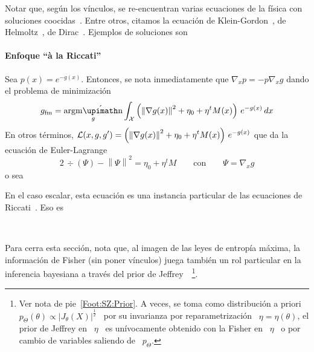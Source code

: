 Notar  que, seg\'un  los v\'inculos,  se re-encuentran  varias ecuaciones  de la
f\'isica con  soluciones coocidas~\cite{Fri98, Fri04}.  Entre  otros, citamos la
ecuaci\'on   de   Klein-Gordon~\cite{Fri90,    FriSof95,   Fri98,   Fri04},   de
Helmoltz~\cite{Fri90, FriSof95,  Fri98, Fri04}, de  Dirac~\cite{FriSof95, Fri98,
Fri04}. Ejemplos de soluciones son
%
\begin{itemize}
\end{itemize}




\paragraph{Enfoque ``\`a la Riccati''}

\cite{BorLew96, BorLew95, Ziv98, FriPla99}

Sea $p(x)  = e^{  - g(x)}$. Entonces,  se nota  inmediatamente que
$\nabla_x p = - p \nabla_x g$ dando el problema de minimizaci\'on
%
\[
g_{\mathrm{fm}} = \argmin_g \int_\X  \left( \left\| \nabla g(x) \right\|^2 + \eta_0  
  + \eta^t M(x) \right) \, e^{- g(x) } \, dx
\]
%
En otros t\'erminos, $\displaystyle \mathcal{L}(x , g , g') = \left( \left\| \nabla g(x) \right\|^2 + \eta_0  
  + \eta^t M(x) \right) \, e^{- g(x) }$ que da la ecuaci\'on de Euler-Lagrange
%
\[
2 \, \div\left( \Psi \right) - \left\| \Psi \right\|^2 = \eta_0 + \eta^t M \qquad \mbox{con} \qquad \Psi = \nabla_x g
\]
%
o sea

En el caso escalar, esta ecuaci\'on es una instancia particular de las ecuaciones de Riccati~\cite{Ric1724, Ric59}. Eso es 





\

Para  cerra esta  secci\'on, nota  que,  al imagen  de las  leyes de  entrop\'ia
m\'axima, la informaci\'on  de Fisher (sin poner v\'inculos)  juega tambi\'en un
rol   particular  en   la  inferencia   bayesiana  a   trav\'es  del   prior  de
Jeffrey~\cite{Jef46,    Jef48,    LehCas98,   Rob07}~\footnote{Ver    nota    de
pie~\ref{Foot:SZ:Prior}.   A  veces, se  toma  como  distribuci\'on a  priori  \
$p_\Theta(\theta)  \propto  |J_\theta(X)|^\frac12$  \   por  su  invarianza  por
reparametrizaci\'on  \ $\eta  =  \eta(\theta)$, \ie  el prior  de  Jeffrey en  \
$\eta$ \ es un\'ivocamente obtenido con la Fisher  en \ $\eta$ \ o por cambio de
variables saliendo de \ $p_\Theta$.}.


